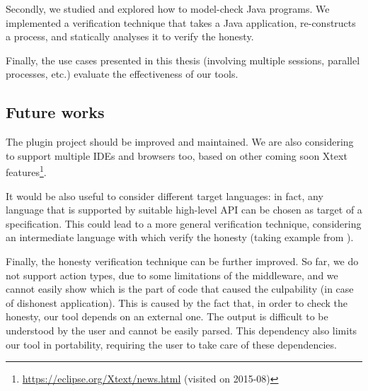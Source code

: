 Secondly, we studied and explored how to model-check Java programs. We implemented a verification technique that takes a Java application, re-constructs a \coco process, and statically analyses it to verify the honesty.

Finally, the use cases presented in this thesis (involving multiple sessions, parallel processes, etc.) evaluate the effectiveness of our tools.

\subsection*{Future works}
The plugin project should be improved and maintained. We are also considering to support multiple IDEs and browsers too, based on other coming soon Xtext features\footnote{\url{https://eclipse.org/Xtext/news.html} (visited on 2015-08)}.


It would be also useful to consider different \coco target languages: in fact, any language that is supported by suitable high-level API can be chosen as target of a \coco specification. 
This could lead to a more general verification technique, considering an intermediate language with which verify the honesty (taking example from \cite{juhaszviper}).

Finally, the honesty verification technique can be further improved. So far, we do not support action types, due to some limitations of the middleware, and 
we cannot easily show which is the part of code that caused the culpability (in case of dishonest application). 
This is caused by the fact that, in order to check the honesty, our tool depends on an external one. The output is difficult to be understood by the user and cannot be easily parsed. 
This dependency also limits our tool in portability, requiring the user to take care of these dependencies.

